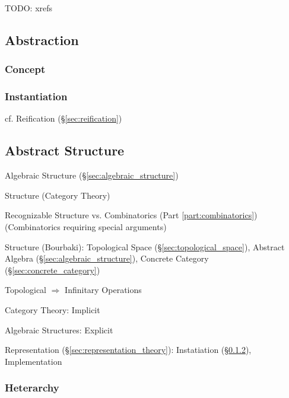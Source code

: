 TODO: xrefs



\subsection{Abstraction}\label{sec:abstraction}

\subsubsection{Concept}\label{sec:concept}

\subsubsection{Instantiation}\label{sec:instantiation}

\fist cf. Reification (\S\ref{sec:reification})



\subsection{Abstract Structure}\label{sec:abstract_structure}


Algebraic Structure (\S\ref{sec:algebraic_structure})

Structure (Category Theory) %

Recognizable Structure vs. Combinatorics (Part
\ref{part:combinatorics}) (Combinatorics requiring special arguments)

Structure (Bourbaki): Topological Space
(\S\ref{sec:topological_space}), Abstract Algebra
(\S\ref{sec:algebraic_structure}), Concrete Category
(\S\ref{sec:concrete_category})

Topological $\Rightarrow$ Infinitary Operations

Category Theory: Implicit

Algebraic Structures: Explicit

Representation (\S\ref{sec:representation_theory}): Instatiation
(\S\ref{sec:instantiation}), Implementation



\subsubsection{Heterarchy}\label{sec:heterarchy}

